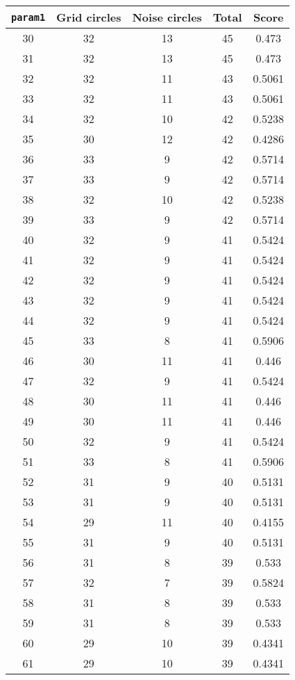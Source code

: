 \documentclass[letterpaper, 12pt]{article}
\begin{document}
\begin{longtable}{|c|c|c|c|c|}
\hline
\textbf{\texttt{param1}} & \textbf{Grid circles} & \textbf{Noise circles} & \textbf{Total} & \textbf{Score} \\
\hline
30 & 32 & 13 & 45 & 0.473 \\
\hline
31 & 32 & 13 & 45 & 0.473 \\
\hline
32 & 32 & 11 & 43 & 0.5061 \\
\hline
33 & 32 & 11 & 43 & 0.5061 \\
\hline
34 & 32 & 10 & 42 & 0.5238 \\
\hline
35 & 30 & 12 & 42 & 0.4286 \\
\hline
36 & 33 & 9 & 42 & 0.5714 \\
\hline
37 & 33 & 9 & 42 & 0.5714 \\
\hline
38 & 32 & 10 & 42 & 0.5238 \\
\hline
39 & 33 & 9 & 42 & 0.5714 \\
\hline
40 & 32 & 9 & 41 & 0.5424 \\
\hline
41 & 32 & 9 & 41 & 0.5424 \\
\hline
42 & 32 & 9 & 41 & 0.5424 \\
\hline
43 & 32 & 9 & 41 & 0.5424 \\
\hline
44 & 32 & 9 & 41 & 0.5424 \\
\hline
45 & 33 & 8 & 41 & 0.5906 \\
\hline
46 & 30 & 11 & 41 & 0.446 \\
\hline
47 & 32 & 9 & 41 & 0.5424 \\
\hline
48 & 30 & 11 & 41 & 0.446 \\
\hline
49 & 30 & 11 & 41 & 0.446 \\
\hline
50 & 32 & 9 & 41 & 0.5424 \\
\hline
51 & 33 & 8 & 41 & 0.5906 \\
\hline
52 & 31 & 9 & 40 & 0.5131 \\
\hline
53 & 31 & 9 & 40 & 0.5131 \\
\hline
54 & 29 & 11 & 40 & 0.4155 \\
\hline
55 & 31 & 9 & 40 & 0.5131 \\
\hline
56 & 31 & 8 & 39 & 0.533 \\
\hline
57 & 32 & 7 & 39 & 0.5824 \\
\hline
58 & 31 & 8 & 39 & 0.533 \\
\hline
59 & 31 & 8 & 39 & 0.533 \\
\hline
60 & 29 & 10 & 39 & 0.4341 \\
\hline
61 & 29 & 10 & 39 & 0.4341 \\

\end{longtable}
\end{document}
